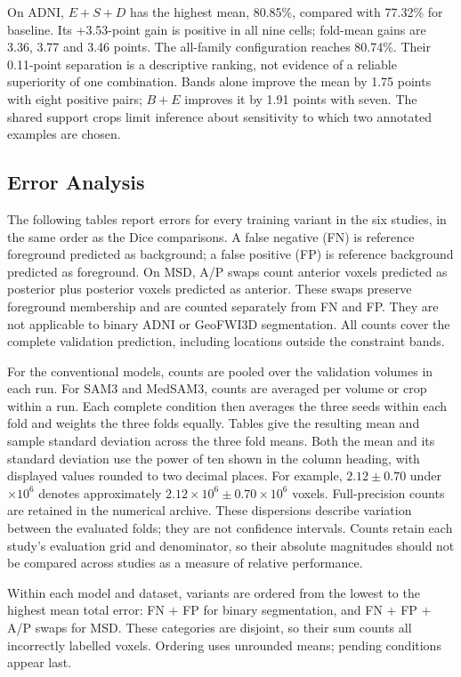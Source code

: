 \documentclass[12pt,a4paper]{article}
\begin{document}
On ADNI, $E+S+D$ has the highest mean, 80.85\%, compared with 77.32\%
for baseline. Its +3.53-point gain is positive in all nine cells;
fold-mean gains are 3.36, 3.77 and 3.46 points. The all-family
configuration reaches 80.74\%. Their 0.11-point separation is a
descriptive ranking, not evidence of a reliable superiority of one
combination. Bands alone improve the mean by 1.75 points with eight
positive pairs; $B+E$ improves it by 1.91 points with seven. The
shared support crops limit inference about sensitivity to which two
annotated examples are chosen.

\FloatBarrier
\subsection{Error Analysis}
\label{sec:error-analysis}
\label{sec:capped-errors-resources}

The following tables report errors for every training variant in the
six studies, in the same order as the Dice comparisons. A false negative
(FN) is reference foreground predicted as background; a false positive
(FP) is reference background predicted as foreground. On MSD, A/P swaps
count anterior voxels predicted as posterior plus posterior voxels
predicted as anterior. These swaps preserve foreground membership and
are counted separately from FN and FP. They are not applicable
to binary ADNI or GeoFWI3D segmentation. All counts cover the complete
validation prediction, including locations outside the constraint bands.

For the conventional models, counts are pooled over the validation
volumes in each run. For SAM3 and MedSAM3, counts are averaged per volume
or crop within a run. Each complete condition then averages the three
seeds within each fold and weights the three folds equally. Tables give
the resulting mean and sample standard deviation across the three fold
means. Both the mean and its standard deviation use the power of ten
shown in the column heading, with displayed values rounded to two decimal
places. For example, $2.12\pm0.70$ under $\times10^6$ denotes
approximately $2.12\times10^6\pm0.70\times10^6$ voxels. Full-precision
counts are retained in the numerical archive.
These dispersions describe variation between the evaluated folds;
they are not confidence intervals. Counts retain each study's evaluation
grid and denominator, so their absolute magnitudes should not be compared
across studies as a measure of relative performance.

Within each model and dataset, variants are ordered from the lowest to
the highest mean total error: FN $+$ FP for binary segmentation, and
FN $+$ FP $+$ A/P swaps for MSD. These categories are disjoint, so their
sum counts all incorrectly labelled voxels. Ordering uses unrounded
means; pending conditions appear last.
\end{document}
